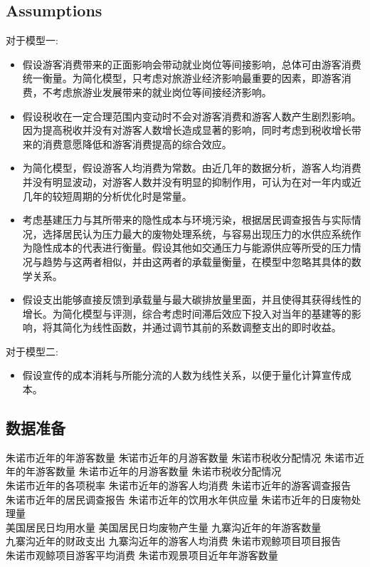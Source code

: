 \documentclass[12pt]{article}  %
\begin{document}
\subsection{Assumptions}
对于模型一:
\begin{itemize}
	\item 假设游客消费带来的正面影响会带动就业岗位等间接影响，总体可由游客消费统一衡量。为简化模型，只考虑对旅游业经济影响最重要的因素，即游客消费，不考虑旅游业发展带来的就业岗位等间接经济影响。
	\item 假设税收在一定合理范围内变动时不会对游客消费和游客人数产生剧烈影响。因为提高税收并没有对游客人数增长造成显著的影响，同时考虑到税收增长带来的消费意愿降低和游客消费提高的综合效应。
	\item 为简化模型，假设游客人均消费为常数。由近几年的数据分析，游客人均消费并没有明显波动，对游客人数并没有明显的抑制作用，可认为在对一年内或近几年的较短周期的分析优化时是常量。
	\item 考虑基建压力与其所带来的隐性成本与环境污染，根据居民调查报告与实际情况，选择居民认为压力最大的废物处理系统，与容易出现压力的水供应系统作为隐性成本的代表进行衡量。假设其他如交通压力与能源供应等所受的压力情况与趋势与这两者相似，并由这两者的承载量衡量，在模型中忽略其具体的数学关系。
	\item 假设支出能够直接反馈到承载量与最大碳排放量里面，并且使得其获得线性的增长。为简化模型与评测，综合考虑时间滞后效应下投入对当年的基建等的影响，将其简化为线性函数，并通过调节其前的系数调整支出的即时收益。
\end{itemize}
对于模型二:
\begin{itemize}
	\item 假设宣传的成本消耗与所能分流的人数为线性关系，以便于量化计算宣传成本。
\end{itemize}
\subsection{数据准备}
\begin{tabbing}
    朱诺市近年的年游客数量 \= 朱诺市近年的月游客数量 \= 朱诺市税收分配情况 \kill
    朱诺市近年的年游客数量 \> 朱诺市近年的月游客数量 \> 朱诺市税收分配情况 \\
    朱诺市近年的各项税率 \> 朱诺市近年的游客人均消费 \> 朱诺市近年的游客调查报告 \\
    朱诺市近年的居民调查报告 \> 朱诺市近年的饮用水年供应量 \> 朱诺市近年的日废物处理量 \\
    美国居民日均用水量 \> 美国居民日均废物产生量 \> 九寨沟近年的年游客数量 \\
    九寨沟近年的财政支出 \> 九寨沟近年的游客人均消费 \> 朱诺市观鲸项目项目报告 \\
    朱诺市观鲸项目游客平均消费 \> 朱诺市观景项目近年年游客数量
\end{tabbing}
\end{document}
